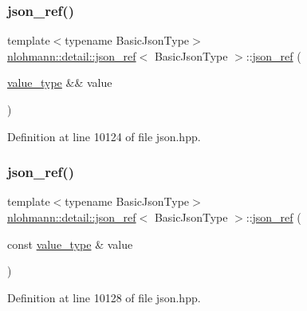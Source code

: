 \subsubsection{\texorpdfstring{json\+\_\+ref()}{json\_ref()}\hspace{0.1cm}{\footnotesize\ttfamily [1/6]}}
{\footnotesize\ttfamily template$<$typename Basic\+Json\+Type$>$ \\
\hyperlink{classnlohmann_1_1detail_1_1json__ref}{nlohmann\+::detail\+::json\+\_\+ref}$<$ Basic\+Json\+Type $>$\+::\hyperlink{classnlohmann_1_1detail_1_1json__ref}{json\+\_\+ref} (\begin{DoxyParamCaption}\item[{\hyperlink{classnlohmann_1_1detail_1_1json__ref_a78d76cf288141049568c0d670ed670ef}{value\+\_\+type} \&\&}]{value }\end{DoxyParamCaption})\hspace{0.3cm}{\ttfamily [inline]}}



Definition at line 10124 of file json.\+hpp.

\mbox{\label{classnlohmann_1_1detail_1_1json__ref_a8c3eb3c6e952ed0cd7eece586ab4047c}} 
\subsubsection{\texorpdfstring{json\+\_\+ref()}{json\_ref()}\hspace{0.1cm}{\footnotesize\ttfamily [2/6]}}
{\footnotesize\ttfamily template$<$typename Basic\+Json\+Type$>$ \\
\hyperlink{classnlohmann_1_1detail_1_1json__ref}{nlohmann\+::detail\+::json\+\_\+ref}$<$ Basic\+Json\+Type $>$\+::\hyperlink{classnlohmann_1_1detail_1_1json__ref}{json\+\_\+ref} (\begin{DoxyParamCaption}\item[{const \hyperlink{classnlohmann_1_1detail_1_1json__ref_a78d76cf288141049568c0d670ed670ef}{value\+\_\+type} \&}]{value }\end{DoxyParamCaption})\hspace{0.3cm}{\ttfamily [inline]}}



Definition at line 10128 of file json.\+hpp.

